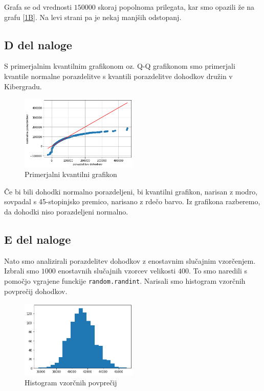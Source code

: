 \documentclass{article}
\begin{document}
Grafa se od vrednosti $150000$ skoraj popolnoma prilegata,
kar smo opazili že na grafu \ref{1B}. Na levi strani pa je nekaj manjših odstopanj.


\subsection{D del naloge}
S primerjalnim kvantilnim grafikonom oz. Q-Q grafikonom smo primerjali kvantile normalne porazdelitve s kvantili 
porazdelitve dohodkov družin v Kibergradu.
\begin{figure}[H]
    \begin{center}
        \includegraphics*[width=0.5\textwidth]{figure1D.png}
        \caption{Primerjalni kvantilni grafikon}
        \label{QQ}
    \end{center}
\end{figure}

Če bi bili dohodki normalno porazdeljeni, bi kvantilni grafikon, narisan z modro, sovpadal s 45-stopinjsko premico,
narisano z rdečo barvo. Iz grafikona razberemo, da dohodki niso porazdeljeni normalno.


\subsection{E del naloge}
Nato smo analizirali porazdelitev dohodkov z enostavnim slučajnim vzorčenjem. Izbrali smo $1000$ enostavnih
slučajnih vzorcev velikosti $400$. To smo naredili s pomočjo vgrajene funckije \texttt{random.randint}. 
Narisali smo histogram vzorčnih povprečij dohodkov.
\begin{figure}[H]
    \begin{center}
        \includegraphics*[width=0.5\textwidth]{figure1E.png}
        \caption{Histogram vzorčnih povprečij}
        \label{hist_vzor}
    \end{center}
\end{figure}
\end{document}
